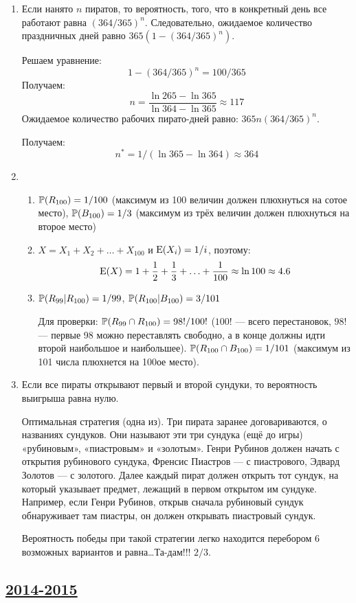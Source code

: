 \begin{enumerate}
\item Если нанято $n$ пиратов, то вероятность, того, что в конкретный день все
работают равна $(364/365)^n$. Следовательно, ожидаемое количество праздничных дней
равно $365(1-(364/365)^n)$.

Решаем уравнение:
\[
1-(364/365)^n=100/365
\]
Получаем:
\[
n=\frac{\ln 265- \ln 365}{ \ln 364 - \ln 365}\approx 117
\]
Ожидаемое количество рабочих пирато-дней равно: $365n(364/365)^n$.

Получаем:
\[
n^*=1/(\ln 365 - \ln 364)\approx 364
\]

\item
\begin{enumerate}
\item $\P(R_{100})=1/100$ (максимум из 100 величин должен плюхнуться на сотое место),
$\P(B_{100})=1/3$ (максимум из трёх величин должен плюхнуться на второе место)
\item $X=X_1+X_2+\ldots + X_{100}$ и $\E(X_i)=1/i$, поэтому:
\[
\E(X)=1+\frac{1}{2} + \frac{1}{3}+\ldots + \frac{1}{100}\approx \ln 100 \approx 4.6
\] 
\item $\P(R_{99} | R_{100})=1/99$, $\P(R_{100}|B_{100})=3/101$

Для проверки: $\P(R_{99} \cap R_{100})=98!/100!$ ($100!$ — всего перестановок,
$98!$ — первые 98 можно переставлять свободно, а в конце должны идти второй
наибольшое и наибольшее). $\P(R_{100} \cap B_{100})=1/101$ (максимум из 101 числа
плюхнется на 100ое место).
\end{enumerate}

\item Если все пираты открывают первый и второй сундуки, то вероятность выигрыша
равна нулю.

Оптимальная стратегия (одна из). Три пирата заранее договариваются, о названиях сундуков.
Они называют эти три сундука (ещё до игры)  «рубиновым», «пиастровым» и «золотым».
Генри Рубинов должен начать с открытия рубинового сундука, Френсис Пиастров —
с пиастрового, Эдвард Золотов — с золотого. Далее каждый пират должен открыть тот
сундук, на который указывает предмет, лежащий в первом открытом им сундуке. Например,
если Генри Рубинов, открыв сначала рубиновый сундук обнаруживает там пиастры, он должен
открывать пиастровый сундук.

Вероятность победы при такой стратегии легко находится перебором 6 возможных вариантов
и равна\ldots Та-дам!!! $2/3$.
\end{enumerate}


\subsection[2014-2015]{\hyperref[sec:kr_01_ip_2014_2015]{2014-2015}}
\label{sec:sol_kr_01_ip_2014_2015}


